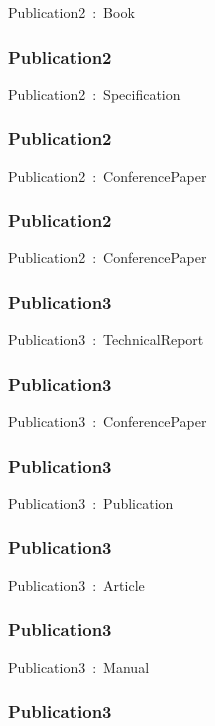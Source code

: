 \documentclass{article}
\begin{document}
Publication2~:~Book

\subsubsection*{Publication2}

Publication2~:~Specification

\subsubsection*{Publication2}

Publication2~:~ConferencePaper

\subsubsection*{Publication2}

Publication2~:~ConferencePaper

\subsubsection*{Publication3}

Publication3~:~TechnicalReport

\subsubsection*{Publication3}

Publication3~:~ConferencePaper

\subsubsection*{Publication3}

Publication3~:~Publication

\subsubsection*{Publication3}

Publication3~:~Article

\subsubsection*{Publication3}

Publication3~:~Manual

\subsubsection*{Publication3}
\end{document}
